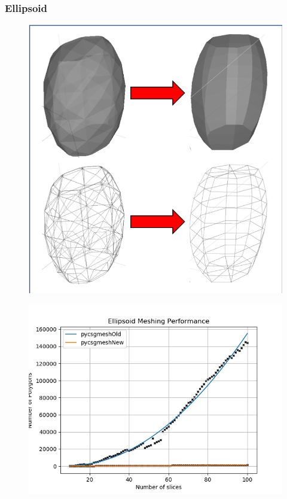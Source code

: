\documentclass[12pt,a4paper]{article}
\begin{document}
\subsubsection{Ellipsoid}

\begin{figure}[h!]
\centering
\begin{minipage}{.2\textwidth}
  \centering
  \includegraphics[height=1\linewidth]{Images//Meshes//ellipsoid.png}
  \label{fig:test1}
\end{minipage}%
\begin{minipage}{.3\textwidth}
  \centering
  \includegraphics[scale=0.35]{Images//Quad_fits//Ellipsoid_quad.png}
  \label{fig:test2}
\end{minipage}%
\end{figure}
\end{document}
